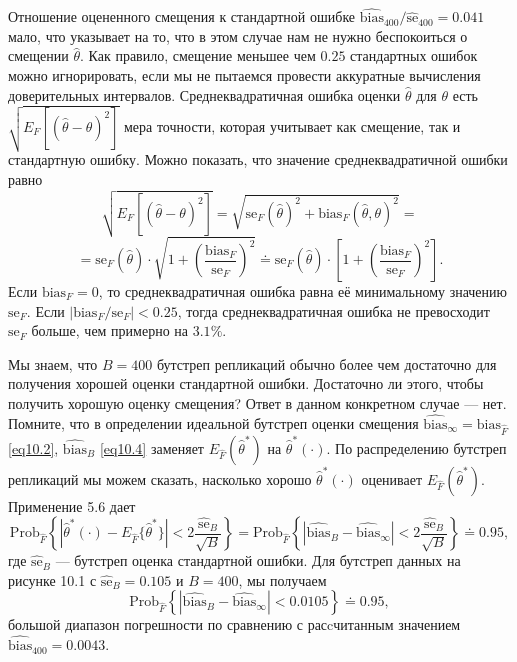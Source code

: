 Отношение оцененного смещения к стандартной ошибке $\widehat{\text{bias}}_{400}/\widehat{\text{se}}_{400} = 0.041$ мало, что указывает на то, что в этом случае нам не нужно беспокоиться о смещении $\hat{\theta}$. Как правило, смещение меньшее чем $0.25$ стандартных ошибок можно игнорировать, если мы не пытаемся провести аккуратные вычисления доверительных интервалов. Среднеквадратичная ошибка оценки $\hat{\theta}$ для $\theta$ есть $\sqrt{E_{F}\left[(\hat{\theta} - \theta)^{2}\right]}$ мера точности, которая учитывает как смещение, так и стандартную ошибку. Можно показать, что значение среднеквадратичной ошибки равно
\begin{equation*}
   \sqrt{E_{F}\left[(\hat{\theta} - \theta)^{2}\right]} = \sqrt{\text{se}_{F}(\hat{\theta})^{2} + \text{bias}_{F}(\hat{\theta}, \theta)^{2}} =
\end{equation*}
\begin{equation}\label{eq10.14}
   =\text{se}_{F}(\hat{\theta}) \cdot \sqrt{1 + \left(\frac{\text{bias}_{F}}{\text{se}_{F}}\right)^{2}} \doteq \text{se}_{F}(\hat{\theta}) \cdot \left[1 + \left(\frac{\text{bias}_{F}}{\text{se}_{F}}\right)^{2}\right].
\end{equation}
Если $\text{bias}_{F} = 0$, то среднеквадратичная ошибка равна её минимальному значению $\text{se}_{F}$. Если $|\text{bias}_{F}/\text{se}_{F}| < 0.25$, тогда среднеквадратичная ошибка не превосходит $\text{se}_{F}$ больше, чем примерно на $3.1\%$.

Мы знаем, что $B = 400$ бутстреп репликаций обычно более чем достаточно для получения хорошей оценки стандартной ошибки. Достаточно ли этого, чтобы получить хорошую оценку смещения? Ответ в данном конкретном случае --- нет. Помните, что в определении идеальной бутстреп оценки смещения  $\widehat{\text{bias}}_{\infty} = \text{bias}_{\hat{F}}$ \ref{eq10.2},  $\widehat{\text{bias}}_{B}$ \ref{eq10.4} заменяет $E_{\hat{F}}(\hat{\theta}^{*})$ на $\hat{\theta}^{*}(\cdot)$. По распределению бутстреп репликаций мы можем сказать, насколько хорошо $\hat{\theta}^{*}(\cdot)$ оценивает $E_{\hat{F}}(\hat{\theta}^{*})$. Применение 5.6 дает
\begin{equation}\label{eq10.15}
    \text{Prob}_{\hat{F}}\left\{|\hat{\theta}^{*}(\cdot)-E_{\hat{F}}\{\hat{\theta}^{*}\}| < 2\frac{\widehat{\text{se}}_{B}}{\sqrt{B}}\right\}
    = \text{Prob}_{\hat{F}}\left\{|\widehat{\text{bias}}_{B}-\widehat{\text{bias}}_{\infty}| < 2\frac{\widehat{\text{se}}_{B}}{\sqrt{B}}\right\} \doteq 0.95,
\end{equation}
где $\widehat{\text{se}}_{B}$ --- бутстреп оценка стандартной ошибки. Для бутстреп данных на рисунке 10.1 с $\widehat{\text{se}}_{B} = 0.105$ и $B = 400$, мы получаем
\begin{equation}\label{eq10.16}
    \text{Prob}_{\hat{F}}\left\{|\widehat{\text{bias}}_{B}-\widehat{\text{bias}}_{\infty}| < 0.0105\right\} \doteq 0.95,
\end{equation}
большой диапазон погрешности по сравнению с расcчитанным значением $\widehat{\text{bias}}_{400} = 0.0043$.

